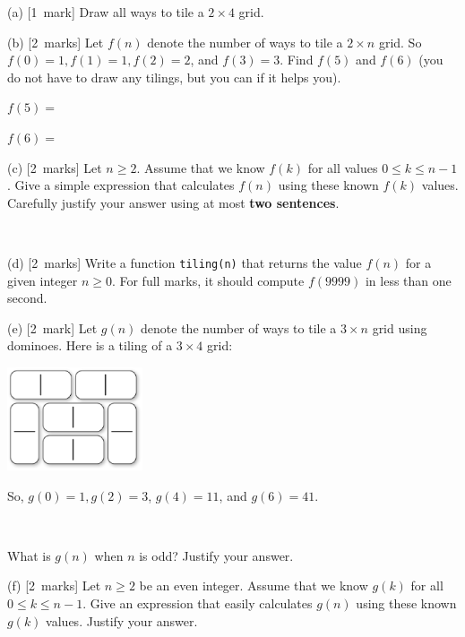 \documentclass[12pt]{article}
\newcommand{\mymarks}[1]{\mbox{\small [#1 marks]}}
\newcommand{\mymark}[1]{\mbox{\small [#1 mark]}}
\begin{document}

\noindent
(a) \mymark{1}
Draw all ways to tile a $2 \times 4$ grid.

\vfill

\noindent
(b) \mymarks{2}
Let $f(n)$ denote the number of ways to tile a $2 \times n$ grid. So $f(0) = 1, f(1) = 1, f(2) = 2$, and $f(3) = 3$.
Find $f(5)$ and $f(6)$ (you do not have to draw any tilings, 
but you can if it helps you).

\vfill
\hfill $f(5)=$ ~ ~ ~ ~

\vfill
\hfill $f(6)=$ ~ ~ ~ ~
\vfill

\noindent
(c) \mymarks{2}
Let $n \geq 2$. Assume that we know $f(k)$ 
for all values $0 \leq k \leq n-1$. 
Give a simple expression that calculates $f(n)$ 
using these known $f(k)$ values. 
Carefully justify your answer using at most {\bf two sentences}.

\vfill\vfill~

\newpage
\noindent
(d) \mymarks{2}
Write a function \texttt{tiling(n)} that returns the value $f(n)$ for a given integer $n \geq 0$. For full marks,
it should compute $f(9999)$ in less than one second.

\vfill
\vfill
\vfill

\noindent
(e) \mymark{2}
Let $g(n)$ denote the number of ways to tile a $3 \times n$ grid 
using dominoes. Here is a tiling of a $3 \times 4$ grid:

\vspace{-5mm}
\begin{center}
\includegraphics[width=40mm]{Figures/34-tiling.eps}
\end{center}
\vspace{-5mm}
\noindent
So, $g(0) = 1, g(2) = 3$, $g(4) = 11$, and $g(6) = 41$.

~

\noindent
What is $g(n)$ when $n$ is odd? Justify your answer.

\vfill

\noindent
(f) \mymarks{2}
Let $n \geq 2$ be an even integer. 
Assume that we know $g(k)$ for all $0 \leq k \leq n-1$. 
Give an expression that easily calculates $g(n)$
using these known $g(k)$ values. Justify your answer.
\end{document}
